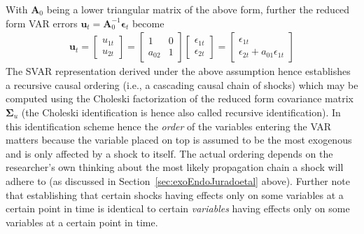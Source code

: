 \documentclass[a4paper,11pt,listof=nochaptergap,oneside,pointednumbers,bibtotoc,bigheadings,liststotoc,hidelinks]{scrbook}
\theoremstyle{mysatz}
\theoremstyle{mydefinition}
\theoremstyle{mytheorem}
\theoremstyle{mybemerkung}
\newcommand{\vect}[1]{\boldsymbol{\mathbf{#1}}}
\begin{document}
With $\vect{A}_0$ being a lower triangular matrix of the above form, further the reduced form VAR errors $\vect{u}_t = \vect{A}_0^{-1}\vect{\epsilon}_t$ become
\begin{equation} \label{eq:svar13}
\begin{split}
 		\vect{u}_t = \begin{bmatrix}
    					u_{1t} \\
					u_{2t} 
 					\end{bmatrix} = 
						\begin{bmatrix}
    						1 & 0 \\
						a_{02} & 1  
 						\end{bmatrix} 
							\begin{bmatrix}
    							\epsilon_{1t} \\
							\epsilon_{2t} 
 							\end{bmatrix} = 
								\begin{bmatrix}
    								\epsilon_{1t} \\
								\epsilon_{2t}+a_{01}\epsilon_{1t} 
 								\end{bmatrix} 			
\end{split}								
\end{equation}
The SVAR representation derived under the above assumption hence establishes a recursive causal ordering (i.e., a cascading causal chain of shocks) which may be computed using the Choleski factorization of the reduced form covariance matrix $\vect{\Sigma}_u$ (the Choleski identification is hence also called recursive identification). In this identification scheme hence the \textit{order} of the variables entering the VAR matters because the variable placed on top is assumed to be the most exogenous and is only affected by a shock to itself. The actual ordering depends on the researcher's own thinking about the most likely propagation chain a shock will adhere to (as discussed in Section~\ref{sec:exoEndoJuradoetal} above). Further note that establishing that certain shocks having effects only on some variables at a certain point in time is identical to certain \textit{variables} having effects only on some variables at a certain point in time.
\end{document}
